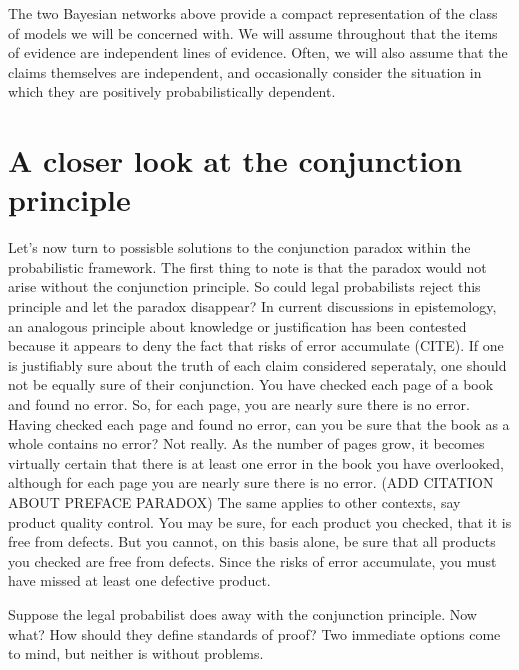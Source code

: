 \documentclass[10pt,dvipsnames,enabledeprecatedfontcommands]{scrartcl}
\begin{document}
The two Bayesian networks above provide a compact representation of the
class of models we will be concerned with. We will assume throughout
that the items of evidence are independent lines of evidence. Often, we
will also assume that the claims themselves are independent, and
occasionally consider the situation in which they are positively
probabilistically dependent.

\hypertarget{a-closer-look-at-the-conjunction-principle}{%
\section{A closer look at the conjunction
principle}\label{a-closer-look-at-the-conjunction-principle}}

Let's now turn to possisble solutions to the conjunction paradox within
the probabilistic framework. The first thing to note is that the paradox
would not arise without the conjunction principle. So could legal
probabilists reject this principle and let the paradox disappear? In
current discussions in epistemology, an analogous principle about
knowledge or justification has been contested because it appears to deny
the fact that risks of error accumulate (CITE).
If one is justifiably sure about the truth of each claim considered
seperataly, one should not be equally sure of their conjunction. You
have checked each page of a book and found no error. So, for each page,
you are nearly sure there is no error. Having checked each page and
found no error, can you be sure that the book as a whole contains no
error? Not really. As the number of pages grow, it becomes virtually
certain that there is at least one error in the book you have
overlooked, although for each page you are nearly sure there is no
error. (ADD CITATION ABOUT PREFACE PARADOX) The same applies to other
contexts, say product quality control. You may be sure, for each product
you checked, that it is free from defects. But you cannot, on this basis
alone, be sure that all products you checked are free from defects.
Since the risks of error accumulate, you must have missed at least one
defective product.

Suppose the legal probabilist does away with the conjunction principle.
Now what? How should they define standards of proof? Two immediate
options come to mind, but neither is without problems.
\end{document}
